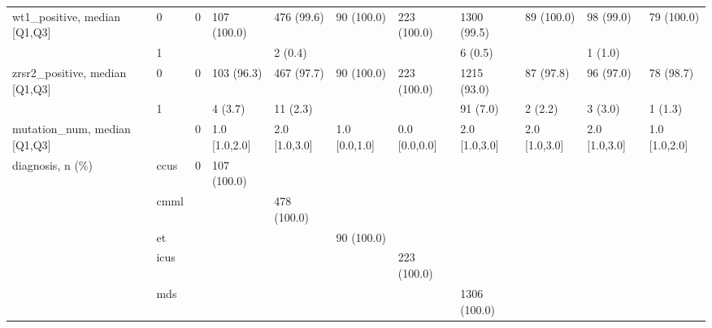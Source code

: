 \begin{tabular}{lllllllllll}
wt1\_positive, median [Q1,Q3] & 0 &                    0 &         107 (100.0) &         476 (99.6) &           90 (100.0) &         223 (100.0) &       1300 (99.5) &        89 (100.0) &           98 (99.0) &           79 (100.0) \\
                 & 1 &                      &                     &            2 (0.4) &                      &                     &           6 (0.5) &                   &             1 (1.0) &                      \\
zrsr2\_positive, median [Q1,Q3] & 0 &                    0 &          103 (96.3) &         467 (97.7) &           90 (100.0) &         223 (100.0) &       1215 (93.0) &         87 (97.8) &           96 (97.0) &            78 (98.7) \\
                 & 1 &                      &             4 (3.7) &           11 (2.3) &                      &                     &          91 (7.0) &           2 (2.2) &             3 (3.0) &              1 (1.3) \\
mutation\_num, median [Q1,Q3] &    &                    0 &       1.0 [1.0,2.0] &      2.0 [1.0,3.0] &        1.0 [0.0,1.0] &       0.0 [0.0,0.0] &     2.0 [1.0,3.0] &     2.0 [1.0,3.0] &       2.0 [1.0,3.0] &        1.0 [1.0,2.0] \\
diagnosis, n (\%) & ccus &                    0 &         107 (100.0) &                    &                      &                     &                   &                   &                     &                      \\
                 & cmml &                      &                     &        478 (100.0) &                      &                     &                   &                   &                     &                      \\
                 & et &                      &                     &                    &           90 (100.0) &                     &                   &                   &                     &                      \\
                 & icus &                      &                     &                    &                      &         223 (100.0) &                   &                   &                     &                      \\
                 & mds &                      &                     &                    &                      &                     &      1306 (100.0) &                   &                     &                      \\

\end{tabular}
